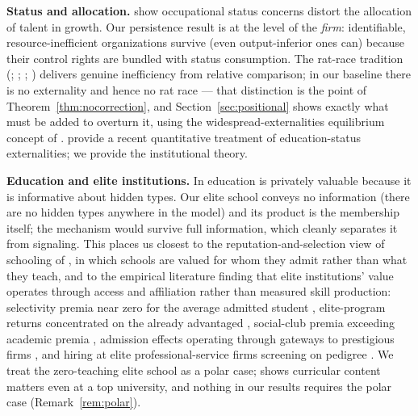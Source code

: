 \documentclass[12pt,letterpaper]{article}
\theoremstyle{definition}
\begin{document}
\textbf{Status and allocation.}
\citet{fershtmanmurphyweiss1996} show occupational status concerns distort the allocation of talent in growth.
Our persistence result is at the level of the \emph{firm}: identifiable, resource-inefficient organizations survive (even output-inferior ones can) because their control rights are bundled with status consumption.
The rat-race tradition (\citealt{akerlof1976caste}; \citealt{hopkinskornienko2004}; \citealt{frank1985demand}; \citealt{hirsch1976social}) delivers genuine inefficiency from relative comparison; in our baseline there is no externality and hence no rat race --- that distinction is the point of Theorem~\ref{thm:nocorrection}, and Section~\ref{sec:positional} shows exactly what must be added to overturn it, using the widespread-externalities equilibrium concept of \citet{noguchizame2006externalities}.
\citet{kimtertiltyum2024} provide a recent quantitative treatment of education-status externalities; we provide the institutional theory.

\textbf{Education and elite institutions.}
In \citet{spence1973signaling} education is privately valuable because it is informative about hidden types.
Our elite school conveys no information (there are no hidden types anywhere in the model) and its product is the membership itself; the mechanism would survive full information, which cleanly separates it from signaling.
This places us closest to the reputation-and-selection view of schooling of \citet{macleodurquiola2019}, in which schools are valued for whom they admit rather than what they teach, and to the empirical literature finding that elite institutions' value operates through access and affiliation rather than measured skill production: selectivity premia near zero for the average admitted student \citep{dalekrueger2002}, elite-program returns concentrated on the already advantaged \citep{zimmerman2019elite}, social-club premia exceeding academic premia \citep{michelmanpricezimmerman2022}, admission effects operating through gateways to prestigious firms \citep{chettydemingfriedman2026}, and hiring at elite professional-service firms screening on pedigree \citep{rivera2015pedigree}.
We treat the zero-teaching elite school as a polar case; \citet{arteaga2018} shows curricular content matters even at a top university, and nothing in our results requires the polar case (Remark~\ref{rem:polar}).
\end{document}
